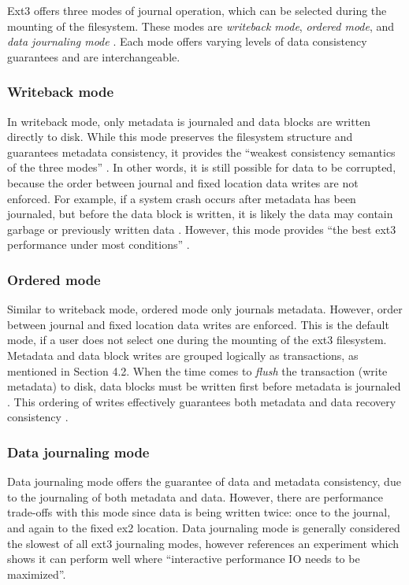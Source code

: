 Ext3 offers three modes of journal operation, which can be selected during the mounting of the filesystem. These modes are \emph{writeback mode}, \emph{ordered mode}, and \emph{data journaling mode} \citep{Prabhakaran2005a, Jones2008}. Each mode offers varying levels of data consistency guarantees and are interchangeable.

\subsubsection{Writeback mode}

In writeback mode, only metadata is journaled and data blocks are written directly to disk. While this mode preserves the filesystem structure and guarantees metadata consistency, it provides the ``weakest consistency semantics of the three modes'' \citep[p. 108]{Prabhakaran2005a}. In other words, it is still possible for data to be corrupted, because the order between journal and fixed location data writes are not enforced. For example, if a system crash occurs after metadata has been journaled, but before the data block is written, it is likely the data may contain garbage or previously written data \citep{Jones2008, Prabhakaran2005a}. However, this mode provides ``the best ext3 performance under most conditions'' \citep[p. 2]{Robbins2001b}.

\subsubsection{Ordered mode}

Similar to writeback mode, ordered mode only journals metadata. However, order between journal and fixed location data writes are enforced. This is the default mode, if a user does not select one during the mounting of the ext3 filesystem. Metadata and data block writes are grouped logically as transactions, as mentioned in Section 4.2. When the time comes to \emph{flush} the transaction (write metadata) to disk, data blocks must be written first before metadata is journaled \citep{Robbins2001b}. This ordering of writes effectively guarantees both metadata and data recovery consistency \citep{Jones2008, Prabhakaran2005a}.

\subsubsection{Data journaling mode}

Data journaling mode offers the guarantee of data and metadata consistency, due to the journaling of both metadata and data. However, there are performance trade-offs with this mode since data is being written twice: once to the journal, and again to the fixed ex2 location. Data journaling mode is generally considered the slowest of all ext3 journaling modes, however \citet[p. 3]{Robbins2001b} references an experiment which shows it can perform well where ``interactive performance IO needs to be maximized''.